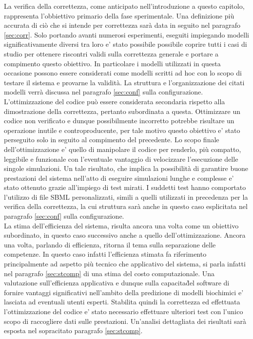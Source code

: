 \documentclass[Lau, oneside]{sapthesis}
\begin{document}
La verifica della correttezza, come anticipato nell'introduzione a questo capitolo, rappresenta l'obbiettivo primario della fase sperimentale. Una definizione più accurata di ciò che si intende per correttezza sarà data in seguito nel paragrafo \ref{sec:corr}. 
Solo portando avanti numerosi esperimenti, eseguiti impiegando modelli significativamente diversi tra loro e' stato possibile possibile coprire tutti i casi di studio per ottenere riscontri validi sulla correttezza generale e portare a compimento questo obiettivo.
In particolare i modelli utilizzati in questa occasione possono essere considerati come modelli scritti ad hoc con lo scopo di testare il sistema e provarne la validità. La struttura e l'organizzazione dei citati modelli verrà discussa nel paragrafo \ref{sec:conf} sulla configurazione.\\

L'ottimizzazione del codice può essere considerata secondaria rispetto alla dimostrazione della correttezza, pertanto subordinata a questa. Ottimizzare un codice non verificato e dunque possibilmente incorretto potrebbe risultare un operazione inutile e controproducente, per tale motivo questo obiettivo e' stato perseguito solo in seguito al compimento del precedente. 
Lo scopo finale dell'ottimizzazione e' quello di manipolare il codice per renderlo, più compatto, leggibile e funzionale con l'eventuale vantaggio di velocizzare l'esecuzione delle singole simulazioni. 
Un tale risultato, che implica la possibilità di garantire buone prestazioni del sistema nell'atto di eseguire simulazioni lunghe e complesse e' stato ottenuto grazie all'impiego di test mirati. I suddetti test hanno comportato l'utilizzo di file SBML personalizzati, simili a quelli utilizzati in precedenza per la verifica della correttezza, la cui struttura sarà anche in questo caso esplicitata nel paragrafo \ref{sec:conf} sulla configurazione.\\

La stima dell'efficienza del sistema, risulta ancora una volta come un obiettivo subordinato, in questo caso successivo anche a quello dell'ottimizzazione. Ancora una volta, parlando di efficienza, ritorna il tema sulla separazione delle competenze. In questo caso infatti l'efficienza stimata fa riferimento principalmente ad aspetto più tecnico che applicativo del sistema, si parla infatti nel paragrafo \ref{sec:stcomp} di una stima del costo computazionale. 
Una valutazione sull'efficienza applicativa e dunque sulla capacita\` del software di fornire vantaggi significativi nell'ambito della predizione di modelli biochimici e' lasciata ad eventuali utenti esperti. Stabilita quindi la correttezza ed effettuata l'ottimizzazione del codice e' stato necessario effettuare ulteriori test con l'unico scopo di raccogliere dati sulle prestazioni. Un'analisi dettagliata dei risultati sarà esposta nel sopracitato paragrafo \ref{sec:stcomp}.\\
\end{document}
